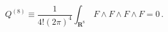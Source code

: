\begin{equation}
 Q^{(8)} \equiv \frac{1}{4!(2\pi)^4}\int_{\mathbf{R}^8} 
 \,F\wedge F\wedge F\wedge F =0\,.
 \label{eq:4.1.11}
\end{equation}

